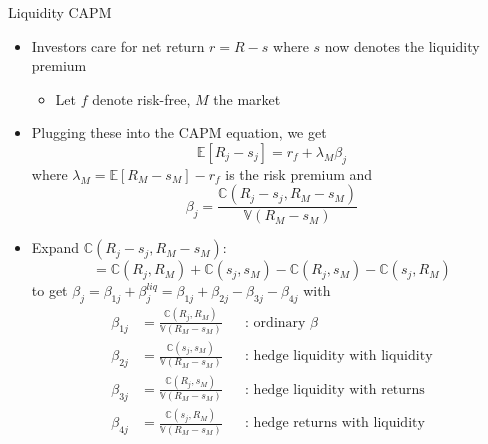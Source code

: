 \documentclass[english,10pt
,aspectratio=169
]{beamer}
\begin{document}
\begin{frame}{Liquidity CAPM}
	\begin{itemize}
		\item Investors care for net return $r=R-s$ where $s$ now denotes the liquidity premium
		\begin{itemize}
			\item Let $f$ denote risk-free, $M$ the market
		\end{itemize}
		\item Plugging these into the CAPM equation, we get
		\[
		\mathbb{E}[R_j-s_j]=r_f + \lambda_M \beta_j
		\]
		where $\lambda_M = \mathbb{E}[R_M-s_M]-r_f$ is the risk premium and
		\[
		\beta_j=\frac{\mathbb{C}(R_j-s_j, R_M-s_M)}{\mathbb{V}(R_M-s_M)}
		\]
	\end{itemize}
\end{frame}


\begin{frame}{}
	\begin{itemize}
		\item Expand $\mathbb{C}(R_j-s_j, R_M-s_M)$:
		\[
		=\mathbb{C}(R_j, R_M)+\mathbb{C}(s_j, s_M)-\mathbb{C}(R_j, s_M)-\mathbb{C}(s_j, R_M)
		\]
		to get $\beta_j=\beta_{1j}+\beta^{liq}_j=\beta_{1j}+\beta_{2j}-\beta_{3j}-\beta_{4j}$ with
		\begin{align*}
		\beta_{1j} 	& = \frac{\mathbb{C}(R_j, R_M)}{\mathbb{V}(R_M-s_M)} 	&& \text{: ordinary $\beta$} \\
		\beta_{2j}	& = \frac{\mathbb{C}(s_j, s_M)}{\mathbb{V}(R_M-s_M)}	&& \text{: hedge liquidity with liquidity}\\
		\beta_{3j}	& = \frac{\mathbb{C}(R_j, s_M)}{\mathbb{V}(R_M-s_M)} 	&& \text{: hedge liquidity with returns} \\
		\beta_{4j}	& = \frac{\mathbb{C}(s_j, R_M)}{\mathbb{V}(R_M-s_M)}	&& \text{: hedge returns with liquidity}
		\end{align*}
	\end{itemize}
\end{frame}


\end{document}
